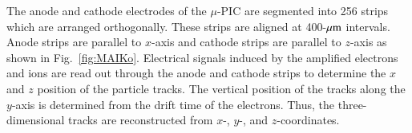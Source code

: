 \documentclass{jps-cp}
\begin{document}
%
The anode and cathode electrodes of the $\mu$-PIC are segmented into 256 strips 
which are arranged orthogonally.
These strips are aligned at 400-$\rm{\mu m}$ intervals.
Anode strips are parallel to $x$-axis and %
cathode strips are parallel to $z$-axis as shown in Fig.~\ref{fig:MAIKo}. %
Electrical signals induced by the amplified electrons and ions are read out through the anode and 
cathode strips to determine the $x$ and $z$ position of the particle tracks.
The vertical position of the tracks along the $y$-axis is determined 
from the drift time of the electrons.
Thus, the three-dimensional tracks are reconstructed from $x$-, $y$-, and $z$-coordinates.
\end{document}

